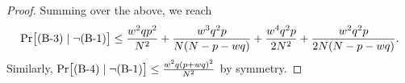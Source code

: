 \begin{proof}
Summing over the above, we reach
%
$${\Pr}\big[\text{(B-3)}\mid\neg\text{(B-1)}\big]\leq\frac{w^2qp^2}{N^2}
+
\frac{w^3q^2p}{N(N-p-wq)}
+
\frac{w^4q^2p}{2N^2}
+
\frac{w^2q^2p}{2N(N-p-wq)}.$$
%
Similarly, ${\Pr}\big[\text{(B-4)}\mid\neg\text{(B-1)}\big] \leq \frac{w^{2} q \left(p+w q\right)^{2}}{N^{2}}$ by symmetry.




%
%
%
%
%
%
%
%



%
%
%



\end{proof}
